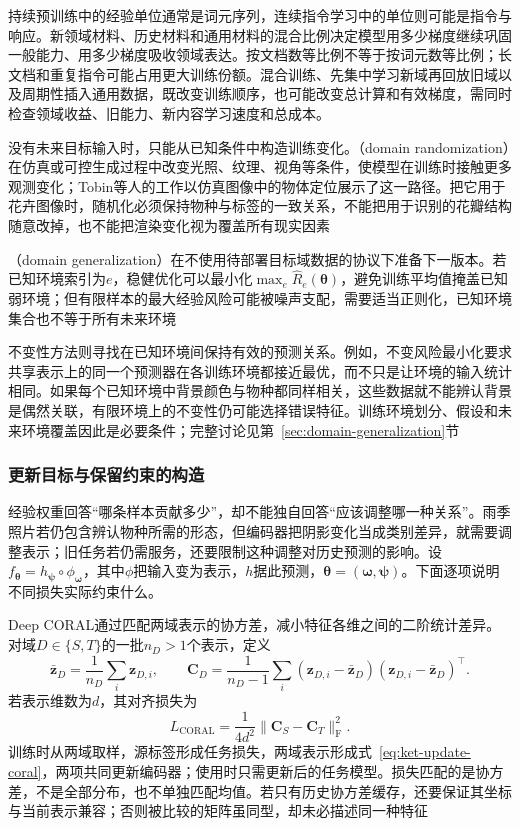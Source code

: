 持续预训练中的经验单位通常是词元序列，连续指令学习中的单位则可能是指令与响应。新领域材料、历史材料和通用材料的混合比例决定模型用多少梯度继续巩固一般能力、用多少梯度吸收领域表达。按文档数等比例不等于按词元数等比例；长文档和重复指令可能占用更大训练份额。混合训练、先集中学习新域再回放旧域以及周期性插入通用数据，既改变训练顺序，也可能改变总计算和有效梯度，需同时检查领域收益、旧能力、新内容学习速度和总成本。

没有未来目标输入时，只能从已知条件中构造训练变化。（domain randomization）在仿真或可控生成过程中改变光照、纹理、视角等条件，使模型在训练时接触更多观测变化；Tobin等人的工作以仿真图像中的物体定位展示了这一路径。把它用于花卉图像时，随机化必须保持物种与标签的一致关系，不能把用于识别的花瓣结构随意改掉，也不能把渲染变化视为覆盖所有现实因素

（domain generalization）在不使用待部署目标域数据的协议下准备下一版本。若已知环境索引为$e$，稳健优化可以最小化$\max_e\hat R_e(\bm{\theta})$，避免训练平均值掩盖已知弱环境；但有限样本的最大经验风险可能被噪声支配，需要适当正则化，已知环境集合也不等于所有未来环境

不变性方法则寻找在已知环境间保持有效的预测关系。例如，不变风险最小化要求共享表示上的同一个预测器在各训练环境都接近最优，而不只是让环境的输入统计相同。如果每个已知环境中背景颜色与物种都同样相关，这些数据就不能辨认背景是偶然关联，有限环境上的不变性仍可能选择错误特征。训练环境划分、假设和未来环境覆盖因此是必要条件；完整讨论见第~\ref{sec:domain-generalization}节

\subsubsection{更新目标与保留约束的构造}
\label{sec:ket-update-objective}

经验权重回答“哪条样本贡献多少”，却不能独自回答“应该调整哪一种关系”。雨季照片若仍包含辨认物种所需的形态，但编码器把阴影变化当成类别差异，就需要调整表示；旧任务若仍需服务，还要限制这种调整对历史预测的影响。设$f_{\bm{\theta}}=h_{\bm{\psi}}\circ\phi_{\bm{\omega}}$，其中$\phi$把输入变为表示，$h$据此预测，$\bm{\theta}=(\bm{\omega},\bm{\psi})$。下面逐项说明不同损失实际约束什么。

Deep CORAL通过匹配两域表示的协方差，减小特征各维之间的二阶统计差异。对域$D\in\{S,T\}$的一批$n_D>1$个表示，定义
\[
\bar{\bm z}_D=\frac1{n_D}\sum_i\bm z_{D,i},\qquad
\bm C_D=\frac1{n_D-1}\sum_i
(\bm z_{D,i}-\bar{\bm z}_D)(\bm z_{D,i}-\bar{\bm z}_D)^\top.
\]
若表示维数为$d$，其对齐损失为
\begin{equation}
L_{\mathrm{CORAL}}=\frac1{4d^2}\lVert\bm C_S-\bm C_T\rVert_{\mathrm F}^2.
\label{eq:ket-update-coral}
\end{equation}
训练时从两域取样，源标签形成任务损失，两域表示形成式~\eqref{eq:ket-update-coral}，两项共同更新编码器；使用时只需更新后的任务模型。损失匹配的是协方差，不是全部分布，也不单独匹配均值。若只有历史协方差缓存，还要保证其坐标与当前表示兼容；否则被比较的矩阵虽同型，却未必描述同一种特征

